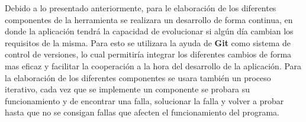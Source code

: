 Debido a lo presentado anteriormente, para le elaboración de los diferentes
componentes de la herramienta se realizara un desarrollo de forma continua,
en donde la aplicación tendrá la capacidad de evolucionar si algún día
cambian los requisitos de la misma. Para esto se utilizara la ayuda de
\textbf{Git} como sistema de control de versiones, lo cual permitiría integrar
los diferentes cambios de forma mas eficaz y facilitar la cooperación a la
hora del desarrollo de la aplicación. Para la elaboración de los diferentes
componentes se usara también un proceso iterativo, cada vez que se implemente
un componente se probara su funcionamiento y de encontrar una falla,
solucionar la falla y volver a probar hasta que no se consigan fallas que
afecten el funcionamiento del programa.

